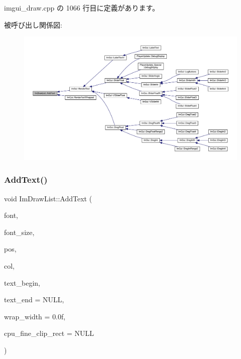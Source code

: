  imgui\+\_\+draw.\+cpp の 1066 行目に定義があります。

被呼び出し関係図\+:\nopagebreak
\begin{figure}[H]
\begin{center}
\leavevmode
\includegraphics[width=350pt]{struct_im_draw_list_ac5221bd86b3429f6d5b6e6ffe454942d_icgraph}
\end{center}
\end{figure}
\mbox{\label{struct_im_draw_list_a0a226cbe9bb1480428e145d8535cda26}} 
\subsubsection{\texorpdfstring{Add\+Text()}{AddText()}\hspace{0.1cm}{\footnotesize\ttfamily [2/2]}}
{\footnotesize\ttfamily void Im\+Draw\+List\+::\+Add\+Text (\begin{DoxyParamCaption}\item[{const \mbox{\hyperlink{struct_im_font}{Im\+Font}} $\ast$}]{font,  }\item[{float}]{font\+\_\+size,  }\item[{const \mbox{\hyperlink{struct_im_vec2}{Im\+Vec2}} \&}]{pos,  }\item[{\mbox{\hyperlink{imgui_8h_a118cff4eeb8d00e7d07ce3d6460eed36}{Im\+U32}}}]{col,  }\item[{const char $\ast$}]{text\+\_\+begin,  }\item[{const char $\ast$}]{text\+\_\+end = {\ttfamily NULL},  }\item[{float}]{wrap\+\_\+width = {\ttfamily 0.0f},  }\item[{const \mbox{\hyperlink{struct_im_vec4}{Im\+Vec4}} $\ast$}]{cpu\+\_\+fine\+\_\+clip\+\_\+rect = {\ttfamily NULL} }\end{DoxyParamCaption})}



